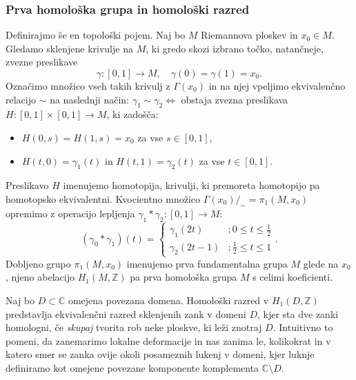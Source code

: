\documentclass[8pt]{beamer}
\theoremstyle{definition}
\theoremstyle{remark}
\theoremstyle{plain}
\numberwithin{equation}{section}  %
\begin{document}
\begin{frame}
    \frametitle{Prva homološka grupa in homološki razred}

    Definirajmo še en topološki pojem. Naj bo $M$ Riemannova ploskev in $x_0 \in M$. Gledamo sklenjene krivulje na $M$, ki gredo skozi izbrano točko, natančneje, zvezne preslikave 
    \begin{equation*}
        \gamma:[0,1] \rightarrow M, \quad \gamma(0)=\gamma(1)=x_0.
    \end{equation*}
    Označimo množico vseh takih krivulj z $\Gamma\left(x_0\right)$ in na njej vpeljimo ekvivalenčno relacijo $\sim$ na naslednji način: $\gamma_1 \sim \gamma_2 \Leftrightarrow$ obstaja zvezna preslikava $H:[0,1] \times[0,1] \rightarrow M$, ki zadošča:
    \begin{itemize}
      \item $H(0, s)=H(1, s)=x_0$ za vse $s \in[0,1]$,
      \item $H(t, 0)=\gamma_1(t)$ in $H(t, 1)=\gamma_2(t)$ za vse $t \in[0,1]$. 
    \end{itemize}
    Preslikavo $H$ imenujemo \textcolor{red1}{homotopija}, krivulji, ki premoreta homotopijo pa \textcolor{red1}{homotopsko ekvivalentni}. Kvocientno množico $\Gamma\left(x_0\right) /_{\sim}=\pi_1\left(M, x_0\right)$ opremimo z operacijo lepljenja $\gamma_1 * \gamma_2:[0,1] \rightarrow M$:
    \begin{equation*}
        \left(\gamma_0 * \gamma_1\right)(t)= \begin{cases}\gamma_1(2 t) &; 0 \leq t \leq \frac{1}{2} \\ \gamma_2(2 t-1) &; \frac{1}{2} \leq t \leq 1\end{cases}.
    \end{equation*}
    Dobljeno grupo $\pi_1\left(M, x_0\right)$ imenujemo \textcolor{red1}{prva fundamentalna grupa} $M$ glede na $x_0$, njeno abelacijo $H_1(M, \mathbb{Z})$ pa \textcolor{red1}{prva homološka grupa} $M$ \textcolor{red1}{s celimi koeficienti}.

    \vspace{0.8em}

    Naj bo $D\subset \mathbb{C}$ omejena povezana domena. \textcolor{red1}{Homološki razred} v $H_1(D, \mathbb{Z})$ predstavlja ekvivalenčni razred sklenjenih zank v domeni $D$, kjer sta dve zanki \textcolor{red1}{homologni}, če \emph{skupaj} tvorita rob neke ploskve, ki leži znotraj $D$. Intuitivno to pomeni, da zanemarimo lokalne deformacije in nas zanima le, kolikokrat in v katero smer se zanka ovije okoli posameznih \textcolor{red1}{lukenj} v domeni, kjer luknje definiramo kot omejene povezane komponente komplementa $\mathbb{C} \setminus D$. 

\end{frame}
\end{document}
